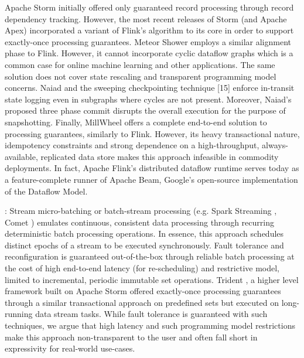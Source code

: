 Apache Storm \cite{CUSTOM:web/Storm} initially offered only guaranteed record processing through record dependency tracking. However, the most recent releases of Storm (and Apache Apex\cite{CUSTOM:web/apex}) incorporated a variant of Flink's algorithm to its core in order to support exactly-once processing guarantees. Meteor Shower \cite{wang2012meteor} employs a similar alignment phase to Flink. However, it cannot incorporate cyclic dataflow graphs which is a common case for online machine learning \cite{de2015samoa} and other applications. The same solution does not cover state rescaling and transparent programming model concerns. Naiad \cite{murray2013naiad} and the sweeping checkpointing technique [15] enforce in-transit state logging even in subgraphs where cycles are not present. Moreover, Naiad's proposed three phase commit disrupts the overall execution for the purpose of snapshotting. Finally, MillWheel \cite{millwheel} offers a complete end-to-end solution to processing guarantees, similarly to Flink. However, its heavy transactional nature, idempotency constraints and strong dependence on a high-throughput, always-available, replicated data store \cite{chang2008bigtable} makes this approach infeasible in commodity deployments. In fact, Apache Flink's distributed dataflow runtime serves today as a feature-complete runner of Apache Beam\cite{CUSTOM:web/beam}, Google's open-source implementation of the Dataflow Model\cite{CUSTOM:web/Dataflow}.

: Stream micro-batching or batch-stream processing (e.g. Spark Streaming \cite{zaharia2012discretized}, Comet \cite{he2010comet}) emulates continuous, consistent data processing through recurring deterministic batch processing operations. In essence, this approach schedules distinct epochs of a stream to be executed synchronously. Fault tolerance and reconfiguration is guaranteed out-of-the-box through reliable batch processing at the cost of high end-to-end latency (for re-scheduling) and restrictive model, limited to incremental, periodic immutable set operations. Trident \cite{CUSTOM:web/trident}, a higher level framework built on Apache Storm offered exactly-once processing guarantees through a similar transactional approach on predefined sets but executed on long-running data stream tasks. While fault tolerance is guaranteed with such techniques, we argue that high latency and such programming model restrictions make this approach non-transparent to the user and often fall short in expressivity for real-world use-cases.
